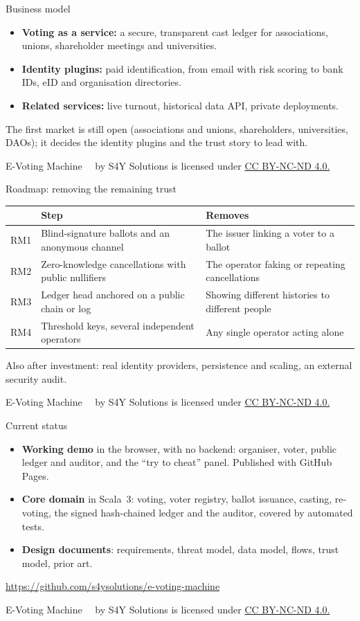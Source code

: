 \documentclass[11pt,aspectratio=169]{beamer}
\newcommand{\currentyear}{\the\year}
\newcommand{\copyrightnote}{
    \vfill
    \begin{flushleft}
    \tiny
    E-Voting Machine \textcopyright~\currentyear~by S4Y Solutions is licensed under
    \href{https://creativecommons.org/licenses/by-nc-nd/4.0}{CC BY-NC-ND 4.0.}
    \end{flushleft}
}
\begin{document}
\begin{frame}{Business model}
    \begin{itemize}
        \item \textbf{Voting as a service:} a secure, transparent cast ledger for associations,
        unions, shareholder meetings and universities.
        \item \textbf{Identity plugins:} paid identification, from email with risk scoring to bank IDs,
        eID and organisation directories.
        \item \textbf{Related services:} live turnout, historical data API, private deployments.
    \end{itemize}
    \medskip
    \footnotesize The first market is still open (associations and unions, shareholders,
    universities, DAOs); it decides the identity plugins and the trust story to lead with.
    \copyrightnote
\end{frame}

\begin{frame}{Roadmap: removing the remaining trust}
    \small
    \renewcommand{\arraystretch}{1.25}
    \begin{tabular}{B{0.07\textwidth}L{0.38\textwidth}L{0.45\textwidth}}
        \toprule
        & Step & Removes \\
        \midrule
        RM1 & Blind-signature ballots and an anonymous channel & The issuer linking a voter to a ballot \\
        RM2 & Zero-knowledge cancellations with public nullifiers & The operator faking or repeating cancellations \\
        RM3 & Ledger head anchored on a public chain or log & Showing different histories to different people \\
        RM4 & Threshold keys, several independent operators & Any single operator acting alone \\
        \bottomrule
    \end{tabular}

    \medskip
    Also after investment: real identity providers, persistence and scaling, an external security audit.
    \copyrightnote
\end{frame}

\begin{frame}{Current status}
    \begin{itemize}
        \item \textbf{Working demo} in the browser, with no backend: organiser, voter, public
        ledger and auditor, and the ``try to cheat'' panel. Published with GitHub Pages.
        \item \textbf{Core domain} in Scala~3: voting, voter registry, ballot issuance, casting,
        re-voting, the signed hash-chained ledger and the auditor, covered by automated tests.
        \item \textbf{Design documents}: requirements, threat model, data model, flows, trust model, prior art.
    \end{itemize}
    \medskip
    \url{https://github.com/s4ysolutions/e-voting-machine}
    \copyrightnote
\end{frame}
\end{document}
